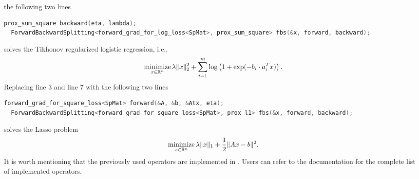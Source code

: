 the following two lines
\begin{lstlisting}[language=C++]
  prox_sum_square backward(eta, lambda);
  ForwardBackwardSplitting<forward_grad_for_log_loss<SpMat>, prox_sum_square> fbs(&x, forward, backward);    
\end{lstlisting}
solves the Tikhonov regularized logistic regression, i.e., 
$$\operatorname*{minimize}_{x \in \mathbb{R}^n} \lambda \|x\|_2^2 + \sum_{i = 1}^m \log\left(1 + \exp(-b_i \cdot a_i^T x)\right).$$
Replacing line 3 and line 7 with
the following two lines
\begin{lstlisting}[language=C++]
  forward_grad_for_square_loss<SpMat> forward(&A, &b, &Atx, eta);
  ForwardBackwardSplitting<forward_grad_for_square_loss<SpMat>, prox_l1> fbs(&x, forward, backward);    
\end{lstlisting}
solves the Lasso problem
$$\operatorname*{minimize}_{x \in \mathbb{R}^n} \lambda \|x\|_1 + \frac{1}{2}\|A x - b\|^2.$$
It is worth mentioning that the previously used operators are implemented in \pkg. Users can refer to the documentation for
the complete list of implemented operators. 

